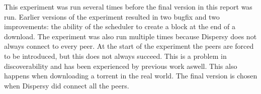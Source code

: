 This experiment was run several times before the final version in this report was run.
Earlier versions of the experiment resulted in two bugfix and two improvements:
the ability of the scheduler to create a block at the end of a download.
The experiment was also run multiple times because Dispersy does not always connect to every peer.
At the start of the experiment the peers are forced to be introduced,
but this does not always succeed.
This is a problem in discoverability and has been experienced by previous work aswell\cite{ruigrok-anonymous}.
This also happens when downloading a torrent in the real world.
The final version is chosen when Dispersy did connect all the peers.

